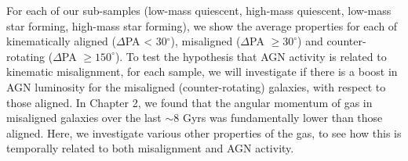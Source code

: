  For each of our sub-samples (low-mass quiescent, high-mass quiescent, low-mass star forming, high-mass star forming), we show the average properties for each of kinematically aligned ($\Delta$PA < 30$^{\circ}$), misaligned ($\Delta$PA $\geq 30^{\circ}$) and counter-rotating ($\Delta$PA $\geq 150^{\circ}$). 
To test the hypothesis that AGN activity is related to kinematic misalignment, for each sample, we will investigate if there is a boost in AGN luminosity for the misaligned (counter-rotating) galaxies, with respect to those aligned. In Chapter 2, we found that the angular momentum of gas in misaligned galaxies over the last $\sim$8 Gyrs was fundamentally lower than those aligned. Here, we investigate various other properties of the gas, to see how this is temporally related to both misalignment and AGN activity.

